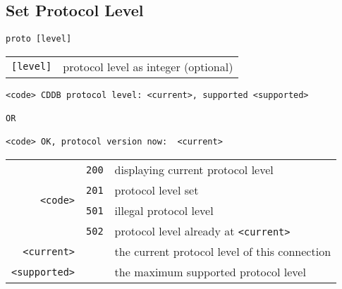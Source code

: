 \subsection{Set Protocol Level}
\begin{Verbatim}[frame=single,label=\textit{To Server},showspaces=true]
proto [level]
\end{Verbatim}
\begin{tabular}{rl}
\texttt{[level]} & protocol level as integer (optional)
\end{tabular}
\begin{Verbatim}[frame=single,label=\textit{From Server},showspaces=true]
<code> CDDB protocol level: <current>, supported <supported>

OR

<code> OK, protocol version now:  <current>
\end{Verbatim}
\begin{tabular}{rcl}
\multirow{4}{3em}{\texttt{<code>}}
& \texttt{200} & displaying current protocol level \\
& \texttt{201} & protocol level set \\
& \texttt{501} & illegal protocol level \\
& \texttt{502} & protocol level already at \texttt{<current>} \\
\texttt{<current>} & & the current protocol level of this connection \\
\texttt{<supported>} & & the maximum supported protocol level
\end{tabular}

\pagebreak

